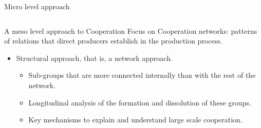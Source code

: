 \documentclass[ignorenonframetext,red,8pt]{beamer}
\begin{document}
\begin{frame}[label=]
\begin{columns}[c]
\begin{column}{0.5\textwidth}
\begin{block}{Micro level approach}
\begin{itemize}
\begin{itemize}
\end{itemize}
\end{itemize}

\end{block}

\end{column}
\end{columns}

\begin{block}{A meso level approach to Cooperation}
Focus on Cooperation networks: patterns of relations that direct producers establish in the production process.
\begin{itemize}

\item Structural approach, that is, a network approach.


\begin{itemize}

\item Sub-groups that are more connected internally than with the rest of the network. 
\item Longitudinal analysis of the formation and dissolution of these groups.
\item Key mechanisms to explain and understand large scale cooperation.

\end{itemize}
\end{itemize}
\end{block}

\end{frame}
\end{document}
